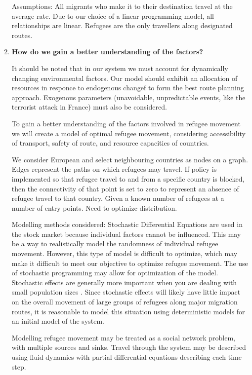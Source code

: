 \documentclass{article}
\begin{document}
\begin{enumerate}
    Assumptions: All migrants who make it to their destination travel at the average rate. Due to our choice of a linear programming model, all relationships are linear. Refugees are the only travellers along designated routes.

    \item {\bf How do we gain a better understanding of the factors?}

    It should be noted that in our system we must account for dynamically changing environmental factors. Our model should exhibit an allocation of resources in responce to endogenous changef to form the best route planning approach. Exogenous parameters (unavoidable, unpredictable events, like the terrorist attack in France) must also be considered.

    To gain a better understanding of the factors involved in refugee movement we will create a model of optimal refugee movement, considering accessibility of transport, safety of route, and resource capacities of countries. 

    We consider European and select neighbouring countries as nodes on a graph. Edges represent the paths on which refugees may travel. If policy is implemented so that refugee travel to and from a specific country is blocked, then the connectivity of that point is set to zero to represent an absence of refugee travel to that country. Given a known number of refugees at a number of entry points. Need to optimize distribution.

    Modelling methods considered:
    Stochastic Differential Equations are used in the stock market because individual factors cannot be influenced. This may be a way to realistically model the randomness of individual refugee movement. However, this type of model is difficult to optimize, which may make it difficult to meet our objective to optimize refugee movement. The use of stochastic programming may allow for optimization of the model. Stochastic effects are generally more important when you are dealing with small population sizes \cite{vries}. Since stochastic effects will likely have little impact on the overall movement of large groups of refugees along major migration routes, it is reasonable to model this situation using deterministic models for an initial model of the system.

    Modelling refugee movement may be treated as a social network problem, with multiple sources and sinks. Travel through the system may be described using fluid dynamics with partial differential equations describing each time step. 


\end{enumerate}
\end{document}
